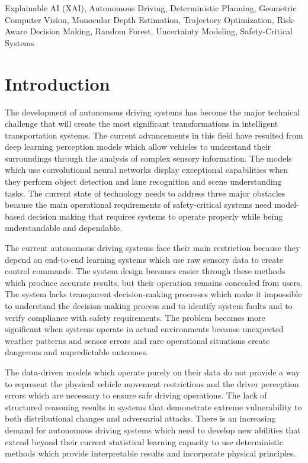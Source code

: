 \documentclass[conference]{IEEEtran}
\begin{document}
\begin{IEEEkeywords}
Explainable AI (XAI), Autonomous Driving, Deterministic Planning, 
Geometric Computer Vision, Monocular Depth Estimation, 
Trajectory Optimization, Risk-Aware Decision Making, 
Random Forest, Uncertainty Modeling, Safety-Critical Systems
\end{IEEEkeywords}

\section{Introduction}
The development of autonomous driving systems has become the major technical challenge that will create the most significant transformations in intelligent transportation systems. The current advancements in this field have resulted from deep learning perception models which allow vehicles to understand their surroundings through the analysis of complex sensory information. The models which use convolutional neural networks display exceptional capabilities when they perform object detection and lane recognition and scene understanding tasks. The current state of technology needs to address three major obstacles because the main operational requirements of safety-critical systems need model-based decision making that requires systems to operate properly while being understandable and dependable.

The current autonomous driving systems face their main restriction because they depend on end-to-end learning systems which use raw sensory data to create control commands. The system design becomes easier through these methods which produce accurate results, but their operation remains concealed from users. The system lacks transparent decision-making processes which make it impossible to understand the decision-making process and to identify system faults and to verify compliance with safety requirements. The problem becomes more significant when systems operate in actual environments because unexpected weather patterns and sensor errors and rare operational situations create dangerous and unpredictable outcomes.

The data-driven models which operate purely on their data do not provide a way to represent the physical vehicle movement restrictions and the driver perception errors which are necessary to ensure safe driving operations. The lack of structured reasoning results in systems that demonstrate extreme vulnerability to both distributional changes and adversarial attacks. There is an increasing demand for autonomous driving systems which need to develop new abilities that extend beyond their current statistical learning capacity to use deterministic methods which provide interpretable results and incorporate physical principles.
\end{document}
